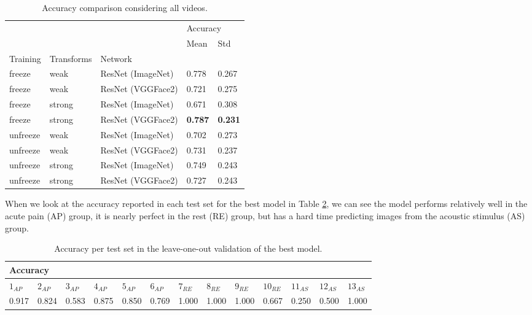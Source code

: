 \begin{table}[h!tp]
\centering
\caption{Accuracy comparison considering all videos.}
\label{tab:accuracy_all}
\begin{tabular}{lllll}
\toprule
         &        &          & \multicolumn{2}{l}{Accuracy} \\
         &        &          &     Mean &    Std \\
Training & Transforms & Network &          &        \\
\midrule
freeze   & weak   & ResNet (ImageNet) &    0.778 &  0.267 \\
freeze   & weak   & ResNet (VGGFace2) &    0.721 &  0.275 \\
freeze   & strong & ResNet (ImageNet) &    0.671 &  0.308 \\
freeze   & strong & ResNet (VGGFace2) &    \textbf{0.787} & \textbf{ 0.231} \\
unfreeze & weak   & ResNet (ImageNet) &    0.702 &  0.273 \\
unfreeze & weak   & ResNet (VGGFace2) &    0.731 &  0.237 \\
unfreeze & strong & ResNet (ImageNet) &    0.749 &  0.243 \\
unfreeze & strong & ResNet (VGGFace2) &    0.727 &  0.243 \\
\bottomrule
\end{tabular}
\end{table}

When we look at the accuracy reported in each test set for the best model in Table \ref{tab:accuracy_leave_one_out}, we can see the model performs relatively well in the acute pain (AP) group, it is nearly perfect in the rest (RE) group, but has a hard time predicting images from the acoustic stimulus (AS) group.

\begin{table}[h!tp]
\setlength{\tabcolsep}{3.41pt}
\centering
\caption{Accuracy per test set in the leave-one-out validation of the best model.}
\label{tab:accuracy_leave_one_out}
\begin{tabular}{lllllllllllll}
\hline
\multicolumn{13}{l}{Accuracy}        \\ \hline
\multicolumn{1}{l|}{$1_{AP}$}  & \multicolumn{1}{l|}{$2_{AP}$}  & \multicolumn{1}{l|}{$3_{AP}$}  & \multicolumn{1}{l|}{$4_{AP}$}  & \multicolumn{1}{l|}{$5_{AP}$}  & \multicolumn{1}{l|}{$6_{AP}$}  & \multicolumn{1}{l|}{$7_{RE}$}  & \multicolumn{1}{l|}{$8_{RE}$}  & \multicolumn{1}{l|}{$9_{RE}$}  & \multicolumn{1}{l|}{$10_{RE}$} & \multicolumn{1}{l|}{$11_{AS}$} & \multicolumn{1}{l|}{$12_{AS}$} & $13_{AS}$ \\ \hline
\multicolumn{1}{l|}{0.917} & \multicolumn{1}{l|}{0.824} & \multicolumn{1}{l|}{0.583} & \multicolumn{1}{l|}{0.875} & \multicolumn{1}{l|}{0.850} & \multicolumn{1}{l|}{0.769} & \multicolumn{1}{l|}{1.000} & \multicolumn{1}{l|}{1.000} & \multicolumn{1}{l|}{1.000} & \multicolumn{1}{l|}{0.667} & \multicolumn{1}{l|}{0.250} & \multicolumn{1}{l|}{0.500} & 1.000 \\ \hline
\end{tabular}
\end{table}

